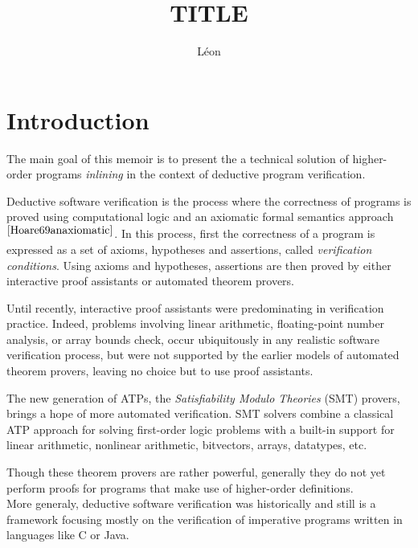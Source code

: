\documentclass[a4paper,11pt,oneside]{article}
\title{TITLE}
\author{Léon}
\theoremstyle{plain}
\begin{document}
\maketitle

\tableofcontents


\section{Introduction}

	The main goal of this memoir is to present the a technical solution of higher-order programs \textit{inlining} in the context of deductive program verification. 
	
	Deductive software verification is the process where the correctness
of programs is proved using computational logic and an axiomatic formal semantics approach$^{\cite{Hoare69anaxiomatic}}$.
	In this process, first the correctness of a program is expressed
as a set of axioms, hypotheses and assertions, called \textit{verification conditions}.
	Using axioms and hypotheses, assertions are then proved
by either interactive proof assistants or automated theorem provers.

	Until recently, interactive proof assistants were predominating
in verification practice.
	Indeed, problems involving linear arithmetic, floating-point number analysis,
or array bounds check, occur ubiquitously in any realistic software
 verification process, but were not supported by the earlier models of automated theorem provers, leaving no choice but to use proof assistants.
	
	The new generation of ATPs, the \textit{Satisfiability Modulo Theories} (SMT) provers, brings a hope of more automated verification.
	SMT solvers combine a classical ATP approach for solving first-order logic problems with a built-in support for linear arithmetic, nonlinear arithmetic, bitvectors, arrays, datatypes, etc.
	
	Though these theorem provers are rather powerful, generally they do not yet perform proofs for programs that make use of higher-order definitions. \\
	 
	More generaly, deductive software verification was historically and still is a framework focusing mostly on the verification of imperative programs written in languages like C or Java.
	
\end{document}
